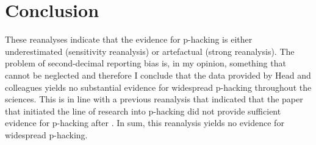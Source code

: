 \section*{Conclusion}
These reanalyses indicate that the evidence for p-hacking is either underestimated (sensitivity reanalysis) or artefactual  (strong reanalysis). The problem of second-decimal reporting bias is, in my opinion, something that cannot be neglected and therefore I conclude that the data provided by Head and colleagues yields no substantial evidence for widespread p-hacking throughout the sciences. This is in line with a previous reanalysis that indicated that the paper that initiated the line of research into p-hacking \cite{Masicampo2012} did not provide sufficient evidence for p-hacking after \cite{Lakens2014}. In sum, this reanalysis yields no evidence for widespread p-hacking.